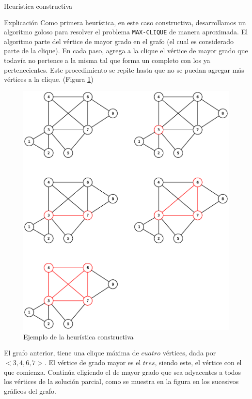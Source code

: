 
\begin{section}{Heurística constructiva}
		\begin{subsection}{Explicación}
			Como primera heurística, en este caso constructiva, desarrollamos un algoritmo goloso para resolver el problema \texttt{MAX-CLIQUE} de manera aproximada. El algoritmo parte del vértice de mayor grado en el grafo (el cual es considerado parte de la clique). En cada paso, agrega a la clique el vértice de mayor grado que todavía no pertence a la misma tal que forma un completo con los ya pertenecientes. Este procedimiento se repite hasta que no se puedan agregar más vértices a la clique. (Figura \ref{fig:seguimiento_constructivo})
			
			\begin{figure}[H]
				\centering
		    	\includegraphics[scale=0.5]{constructivo/seguimiento.eps}
			    \caption{Ejemplo de la heurística constructiva}
			    \label{fig:seguimiento_constructivo}
			\end{figure}
			
			El grafo anterior, tiene una clique máxima de $cuatro$ vértices, dada por $<3,4,6,7>$. El vértice de grado mayor es el $tres$, siendo este, el vértice con el que comienza.
			Continúa eligiendo el de mayor grado que sea adyacentes a todos los vértices de la solución parcial, como se muestra en la figura en los sucesivos gráficos del grafo.


\end{subsection}
\end{section}
